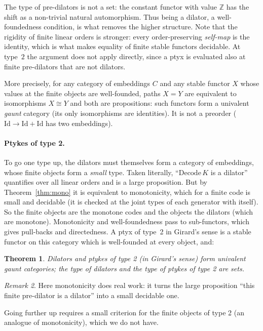 \documentclass[11pt]{article}
\newtheorem{theorem}{Theorem}[section]
\theoremstyle{definition}
\theoremstyle{remark}
\newtheorem{remark}[theorem]{Remark}
\begin{document}
The type of pre-dilators is not a set: the constant functor with value
$\mathbb{Z}$ has the shift as a non-trivial natural automorphism. Thus
being a dilator, a well-foundedness condition, is what removes the higher
structure. Note that the rigidity of finite linear orders is stronger: every
order-preserving \emph{self-map} is the identity, which is what makes
equality of finite stable functors decidable. At type~$2$ the argument does
not apply directly, since a ptyx is evaluated also at finite pre-dilators
that are not dilators.

More precisely, for any category of embeddings $C$ and any stable functor
$X$ whose values at the finite objects are well-founded, paths $X=Y$ are
equivalent to isomorphisms $X\cong Y$ and both are propositions: such
functors form a univalent \emph{gaunt} category (its only isomorphisms are
identities). It is not a preorder ($\mathrm{Id}\to\mathrm{Id}+\mathrm{Id}$
has two embeddings).

\paragraph{Ptykes of type 2.} To go one type up, the dilators must
themselves form a category of embeddings, whose finite objects form a
\emph{small} type. Taken literally, ``$\mathrm{Decode}\,K$ is a dilator''
quantifies over all linear orders and is a large proposition. But by
Theorem~\ref{thm:mono} it is equivalent to monotonicity, which for a
finite code is small and decidable (it is checked at the joint types of
each generator with itself). So the finite objects are the monotone codes
and the objects the dilators (which are monotone).
Monotonicity and well-foundedness pass to sub-functors, which gives
pull-backs and directedness. A ptyx of type~2 in Girard's sense is a stable
functor on this category which is well-founded at every object, and:

\begin{theorem}
Dilators and ptykes of type 2 (in Girard's sense) form univalent gaunt
categories; the type of dilators and the type of ptykes of type 2 are sets.
\end{theorem}

\begin{remark}
Here monotonicity does real work: it turns the large proposition ``this
finite pre-dilator is a dilator'' into a small decidable one.
\end{remark}

Going further up requires a small criterion for the finite objects of type
2 (an analogue of monotonicity), which we do not have.
\end{document}
